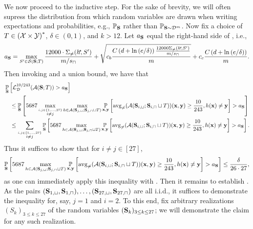 \begin{proofof}{}
We now proceed to the inductive step. For the sake of brevity, we will often supress the distribution from which random variables are drawn when writing expectations and probabilities, e.g., $ \operatorname*{\mathbb{P}}_{\mathbf{S}}$ rather than $\operatorname*{\mathbb{P}}_{\mathbf{S}\sim \mathcal{D}^{m}}$.
Now fix a choice of $T \in \left (\mathcal{X} \times \mathcal{Y} \right)^{*} $, $\delta \in (0, 1)$, and $k > 12$. 
Let $ a_{\mathbf{S}} $ equal the right-hand side of , i.e.,
\begin{align}\label{eq:upperbound-2}
    a_{\mathbf{S}}=\max\limits_{S'\in\mathcal{S}(\mathbf{S};T)} \frac{12000 \cdot \Sigma_{\not=}(h^{\negmedspace\star}\negmedspace,S')}{m/s_{\sqcap}}+\sqrt{c_b \frac{C\left(d+\ln{(e/\delta )}\right) \frac{12000\Sigma_{\not=}(h^{\negmedspace\star}\negmedspace,S')}{m/s_{\sqcap}}}{m}} +c_c\frac{C\left(d+\ln{(e/\delta )}\right)}{m}.  
\end{align}
Then invoking  and a union bound, we have that
\begin{align}\label{eq:upperbound-1}
    &\operatorname*{\mathbb{P}}_{\mathbf{S}}\left[\operatorname{\mathcal{L}}_{\mathcal{D}}^{10/243}(\mathcal{A}(\mathbf{S};T))> a_{\mathbf{S}}\right]
    \\ 
    &\quad \leq\operatorname*{\mathbb{P}}_{\mathbf{S}}\left[5687\max_{\stackrel{i,j\in \{ 1,\ldots,27 \}}{i\not=j} } \max_{h\in \mathcal{A}(\mathbf{S}_{j,\sqcup};\mathbf{S}_{j,\sqcap}\sqcup T)}\operatorname*{\mathbb{P}}_{\mathbf{x},\mathbf{y}}\left[\operatorname{\mathrm{avg}_{\not=}}(\mathcal{A}(\mathbf{S}_{i,\sqcup};\mathbf{S}_{i,\sqcap}\sqcup T))(\mathbf{x},\mathbf{y})\geq\frac{10}{243},h(\mathbf{x})\not=\mathbf{y}\right] >a_{\mathbf{S}}\right]\nonumber
    \\
    &\quad \leq\sum_{\stackrel{i,j\in \{ 1,\ldots,27 \}}{i\not=j} }\operatorname*{\mathbb{P}}_{\mathbf{S}}\left[5687\max_{h\in \mathcal{A}(\mathbf{S}_{j,\sqcup};\mathbf{S}_{j,\sqcap}\sqcup T)}\operatorname*{\mathbb{P}}_{\mathbf{x},\mathbf{y}}\left[\operatorname{\mathrm{avg}_{\not=}}(\mathcal{A}(\mathbf{S}_{i,\sqcup};\mathbf{S}_{i,\sqcap}\sqcup T))(\mathbf{x},\mathbf{y})\geq\frac{10}{243},h(\mathbf{x})\not=\mathbf{y}\right] >a_{\mathbf{S}}\right].
\end{align}
Thus it suffices to show that for $i \neq j \in [27]$,
\begin{align}\label{eq:upperbound0}
    \operatorname*{\mathbb{P}}_{\mathbf{S}}\left[5687\max_{h\in \mathcal{A}(\mathbf{S}_{j,\sqcup};\mathbf{S}_{j,\sqcap}\sqcup T)}\operatorname*{\mathbb{P}}_{\mathbf{x},\mathbf{y}}\left[\operatorname{\mathrm{avg}_{\not=}}(\mathcal{A}(\mathbf{S}_{i,\sqcup};\mathbf{S}_{i,\sqcap}\sqcup T))(\mathbf{x},\mathbf{y})\geq\frac{10}{243},h(\mathbf{x})\not=\mathbf{y}\right] >a_{\mathbf{S}}\right]\leq  \frac{\delta}{26\cdot27},
\end{align}
as one can immediately apply this inequality with . 
Then it remains to establish . As the pairs $(\mathbf{S}_{1,\sqcup},\mathbf{S}_{1,\sqcap}) , \ldots , (\mathbf{S}_{27,\sqcup},\mathbf{S}_{27,\sqcap})$ are all i.i.d., it suffices to demonstrate the inequality for, say, $ j=1 $ and $ i=2 $. To this end, fix arbitrary realizations $(S_k)_{3 \leq k \leq 27}$ of the random variables $(\mathbf{S}_k)_{3 \leq k \leq 27}$; we will demonstrate the claim for any such realization.  


\end{proofof}
